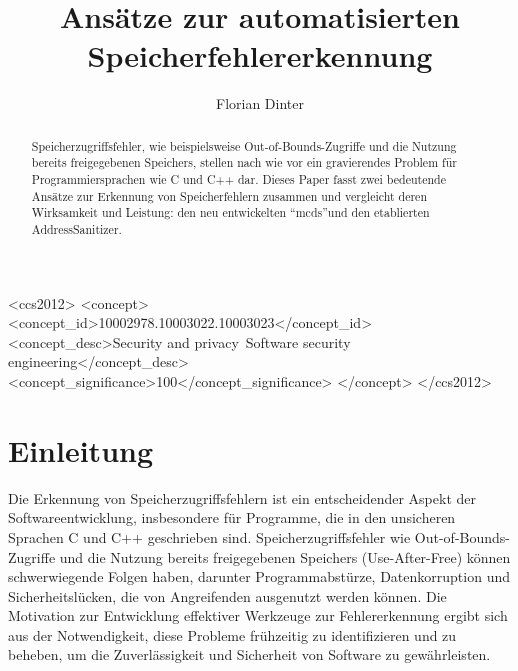 \documentclass[acmtog,nonacm]{acmart}
\begin{document}
\title{Ansätze zur automatisierten Speicherfehlererkennung}

\author{Florian Dinter}


\begin{abstract}
  Speicherzugriffsfehler, wie beispielsweise Out-of-Bounds-Zugriffe
  und die Nutzung bereits freigegebenen Speichers, stellen nach wie
  vor ein gravierendes Problem für Programmiersprachen wie C und C++
  dar. Dieses Paper fasst zwei bedeutende Ansätze zur Erkennung von
  Speicherfehlern zusammen und vergleicht deren Wirksamkeit und
  Leistung: den neu entwickelten "`mcds"'und den etablierten AddressSanitizer.
\end{abstract}

\begin{CCSXML}
  <ccs2012>
  <concept>
  <concept_id>10002978.10003022.10003023</concept_id>
  <concept_desc>Security and privacy~Software security engineering</concept_desc>
  <concept_significance>100</concept_significance>
  </concept>
  </ccs2012>
\end{CCSXML}


\maketitle

\section{Einleitung}

Die Erkennung von Speicherzugriffsfehlern ist ein entscheidender Aspekt der
Softwareentwicklung, insbesondere für Programme, die in den unsicheren Sprachen
C und C++ geschrieben sind. Speicherzugriffsfehler wie Out-of-Bounds-Zugriffe
und die Nutzung bereits freigegebenen Speichers (Use-After-Free) können
schwerwiegende Folgen haben, darunter Programmabstürze, Datenkorruption und
Sicherheitslücken, die von Angreifenden ausgenutzt werden können. Die
Motivation zur Entwicklung effektiver Werkzeuge zur Fehlererkennung ergibt sich
aus der Notwendigkeit, diese Probleme frühzeitig zu identifizieren und zu
beheben, um die Zuverlässigkeit und Sicherheit von Software zu gewährleisten.
\end{document}
